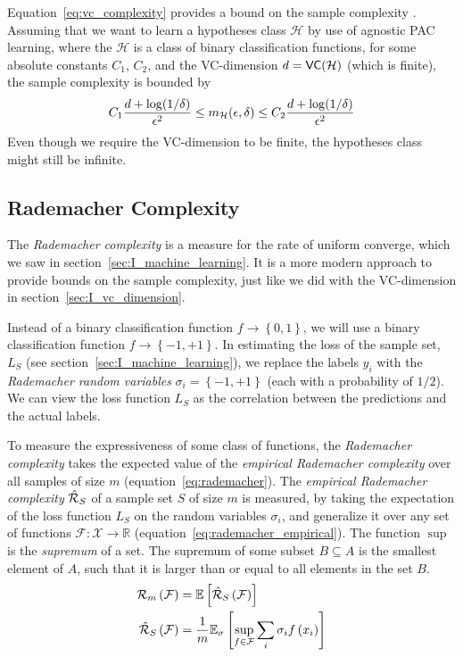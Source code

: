 \documentclass[../main.tex]{subfiles}
\begin{document}
Equation~\ref{eq:vc_complexity} provides a bound on the sample complexity \cite{Vapnik2015, Shalev2014understanding}.
Assuming that we want to learn a hypotheses class $\mathcal{H}$ by use of agnostic PAC learning,
where the $\mathcal{H}$ is a class of binary classification functions,
for some absolute constants $C_{1}$, $C_{2}$, and the VC-dimension $d = \mathsf{VC}(\mathcal{H})$ (which is finite), the sample complexity is bounded by
\begin{align}
    \label{eq:vc_complexity}
    C_{1} \frac{d + \log(1/\delta)}{\epsilon^{2}} \le m_{\mathcal{H}}(\epsilon, \delta) \le C_{2} \frac{d + \log(1/\delta)}{\epsilon^{2}}
\end{align}
Even though we require the VC-dimension to be finite, the hypotheses class might still be infinite.

\subsection{Rademacher Complexity}
\label{sec:I_rademacher}

The \emph{Rademacher complexity} is a measure for the rate of uniform converge, which we saw in section~\ref{sec:I_machine_learning}.
It is a more modern approach \cite{Shalev2014understanding} to provide bounds on the sample complexity,
just like we did with the VC-dimension in section~\ref{sec:I_vc_dimension}.

Instead of a binary classification function $f \to \left\{0, 1\right\}$, we will use a binary classification function $f \to \left\{-1, +1\right\}$.
In estimating the loss of the sample set, $L_{S}$ (see section~\ref{sec:I_machine_learning}),
we replace the labels $y_{i}$ with the \emph{Rademacher random variables} $\sigma_{i} = \left\{-1, +1\right\}$ (each with a probability of $1/2$).
We can view the loss function $L_{S}$ as the correlation between the predictions and the actual labels.

To measure the expressiveness of some class of functions,
the \emph{Rademacher complexity} takes the expected value of the \emph{empirical Rademacher complexity} over all samples of size $m$ (equation~\ref{eq:rademacher}).
The \emph{empirical Rademacher complexity} $\hat{\mathcal{R}}_{S}$ of a sample set $S$ of size $m$ is measured,
by taking the expectation of the loss function $L_{S}$ on the random variables $\sigma_{i}$,
and generalize it over any set of functions $\mathcal{F} : \mathcal{X} \to \mathbb{R} $ (equation~\ref{eq:rademacher_empirical}).
The function $\sup$ is the \emph{supremum} of a set.
The supremum of some subset $B \subseteq A$ is the smallest element of $A$, such that it is larger than or equal to all elements in the set $B$. 
\begin{align}
    \label{eq:rademacher}
    \mathcal{R}_{m}\left(\mathcal{F}\right) &= \mathbb{E}\left[ \hat{\mathcal{R}}_{S}\left(\mathcal{F}\right) \right] \\
    \label{eq:rademacher_empirical}
    \hat{\mathcal{R}}_{S}\left(\mathcal{F}\right) &= \frac{1}{m} \mathbb{E}_{\sigma} \left[\sup_{f \in \mathcal{F}} \sum_{i} \sigma_{i} f\left( x_{i} \right) \right]
\end{align}
\end{document}
